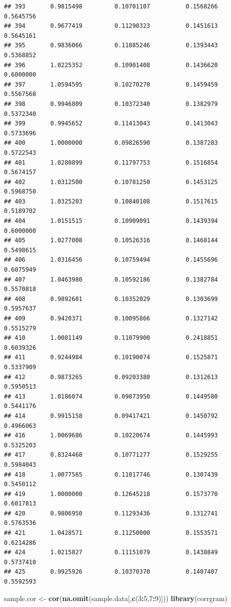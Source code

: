 \documentclass[]{article}
\newenvironment{Shaded}{\begin{snugshade}}{\end{snugshade}}
\newcommand{\DecValTok}[1]{\textcolor[rgb]{0.00,0.00,0.81}{#1}}
\newcommand{\KeywordTok}[1]{\textcolor[rgb]{0.13,0.29,0.53}{\textbf{#1}}}
\newcommand{\NormalTok}[1]{#1}
\newcommand{\OperatorTok}[1]{\textcolor[rgb]{0.81,0.36,0.00}{\textbf{#1}}}
\newcommand{\StringTok}[1]{\textcolor[rgb]{0.31,0.60,0.02}{#1}}
\begin{document}
\begin{verbatim}
## 393       0.9815498         0.10701107          0.1568266        0.5645756
## 394       0.9677419         0.11290323          0.1451613        0.5645161
## 395       0.9836066         0.11885246          0.1393443        0.5368852
## 396       1.0225352         0.10901408          0.1436620        0.6000000
## 397       1.0594595         0.10270270          0.1459459        0.5567568
## 398       0.9946809         0.10372340          0.1382979        0.5372340
## 399       0.9945652         0.11413043          0.1413043        0.5733696
## 400       1.0000000         0.09826590          0.1387283        0.5722543
## 401       1.0280899         0.11797753          0.1516854        0.5674157
## 402       1.0312500         0.10781250          0.1453125        0.5968750
## 403       1.0325203         0.10840108          0.1517615        0.5189702
## 404       1.0151515         0.10909091          0.1439394        0.6000000
## 405       1.0277008         0.10526316          0.1468144        0.5498615
## 406       1.0316456         0.10759494          0.1455696        0.6075949
## 407       1.0463980         0.10592186          0.1382784        0.5570818
## 408       0.9892601         0.10352029          0.1303699        0.5957637
## 409       0.9420371         0.10095866          0.1327142        0.5515279
## 410       1.0081149         0.11079900          0.2418851        0.6039326
## 411       0.9244984         0.10190074          0.1525871        0.5337909
## 412       0.9873265         0.09203380          0.1312613        0.5950513
## 413       1.0186074         0.09873950          0.1449580        0.5441176
## 414       0.9915158         0.09417421          0.1450792        0.4966063
## 416       1.0069686         0.10220674          0.1445993        0.5325203
## 417       0.8324468         0.10771277          0.1529255        0.5984043
## 418       1.0077565         0.11017746          0.1307439        0.5450112
## 419       1.0000000         0.12645218          0.1573770        0.6017813
## 420       0.9806950         0.11293436          0.1312741        0.5763536
## 421       1.0428571         0.11250000          0.1553571        0.6214286
## 424       1.0215827         0.11151079          0.1438849        0.5737410
## 425       0.9925926         0.10370370          0.1407407        0.5592593
\end{verbatim}

\begin{Shaded}
\begin{Highlighting}[]
\NormalTok{sample.cor \textless{}{-}}\StringTok{ }\KeywordTok{cor}\NormalTok{(}\KeywordTok{na.omit}\NormalTok{(sample.data[,}\KeywordTok{c}\NormalTok{(}\DecValTok{3}\OperatorTok{:}\DecValTok{5}\NormalTok{,}\DecValTok{7}\OperatorTok{:}\DecValTok{9}\NormalTok{)]))}
\KeywordTok{library}\NormalTok{(corrgram)}
\end{Highlighting}
\end{Shaded}
\end{document}
